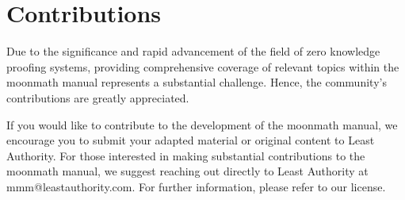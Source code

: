 \section{Contributions}Due to the significance and rapid advancement of the field of zero knowledge proofing systems, providing comprehensive coverage of relevant topics within the moonmath manual represents a substantial challenge. Hence, the community's contributions are greatly appreciated.

If you would like to contribute to the development of the moonmath manual, we encourage you to submit your adapted material or original content to Least Authority. For those interested in making substantial contributions to the moonmath manual, we suggest reaching out directly to Least Authority at mmm@leastauthority.com. For further information, please refer to our license.


